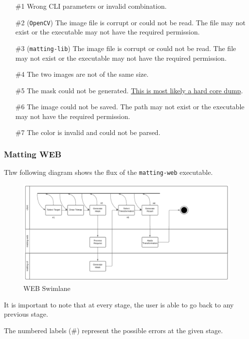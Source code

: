 \documentclass[a4paper]{article}
\begin{document}
\begin{itemize}
    \item[\#1] Wrong CLI parameters or invalid combination.
    \item[\#2] (\texttt{OpenCV}) The image file is corrupt or could not be read.
        The file may not exist or the executable may not have the required
        permission.
    \item[\#3] (\texttt{matting-lib}) The image file is corrupt or could not be read.
        The file may not exist or the executable may not have the required
        permission.
    \item[\#4] The two images are not of the same size.
    \item[\#5] The mask could not be generated. \underline{This is most likely a hard core dump}.
    \item[\#6] The image could not be saved. The path may not exist or the executable
        may not have the required permission.
    \item[\#7] The color is invalid and could not be parsed.
\end{itemize}

\pagebreak

\subsubsection{Matting WEB}

Thw following diagram shows the flux of the \texttt{matting-web} executable.

\begin{figure}[h]
    \includegraphics[width=\textwidth]{media/swimlane/swimlane3.pdf}
    \caption{WEB Swimlane}
\end{figure}

It is important to note that at every stage, the user is able
to go back to any previous stage.

The numbered labels (\#) represent the possible errors at the given stage.
\end{document}
